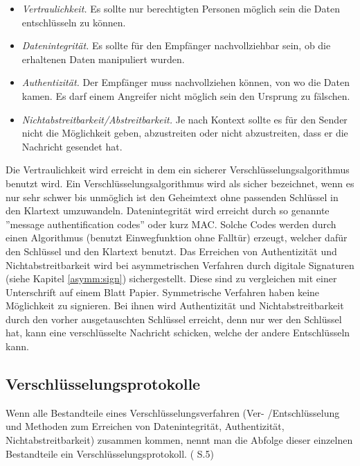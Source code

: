 \documentclass[a4paper,12pt,titlepage]{article}
\begin{document}
\begin{itemize}
\item \textit{Vertraulichkeit.} Es sollte nur berechtigten Personen möglich sein die Daten entschlüsseln zu können.

\item \textit{Datenintegrität.} Es sollte für den Empfänger nachvollziehbar sein, ob die erhaltenen Daten manipuliert wurden.

\item \textit{Authentizität.} Der Empfänger muss nachvollziehen können, von wo die Daten kamen. Es darf einem Angreifer nicht möglich sein den Ursprung zu fälschen.

\item \textit{Nichtabstreitbarkeit/Abstreitbarkeit.} Je nach Kontext sollte es für den Sender nicht die Möglichkeit geben, abzustreiten oder nicht abzustreiten, dass er die Nachricht gesendet hat.
\end{itemize} %
Die Vertraulichkeit wird erreicht in dem ein sicherer Verschlüsselungsalgorithmus benutzt wird. Ein Verschlüsselungsalgorithmus wird als sicher bezeichnet, wenn es nur sehr schwer bis unmöglich ist den Geheimtext ohne passenden Schlüssel in den Klartext umzuwandeln. Datenintegrität wird erreicht durch so genannte ''message authentification codes'' oder kurz MAC. Solche Codes werden durch einen Algorithmus (benutzt Einwegfunktion ohne Falltür) erzeugt, welcher dafür den Schlüssel und den Klartext benutzt. Das Erreichen von Authentizität und Nichtabstreitbarkeit wird bei asymmetrischen Verfahren durch digitale Signaturen (siehe Kapitel \ref{asymm:sign}) sichergestellt. Diese sind zu vergleichen mit einer Unterschrift auf einem Blatt Papier. Symmetrische Verfahren haben keine Möglichkeit zu signieren. Bei ihnen wird Authentizität und Nichtabstreitbarkeit durch den vorher ausgetauschten Schlüssel erreicht, denn nur wer den Schlüssel hat, kann eine verschlüsselte Nachricht schicken, welche der andere Entschlüsseln kann.

\subsection{Verschlüsselungsprotokolle}
Wenn alle Bestandteile eines Verschlüsselungsverfahren (Ver- /Entschlüsselung und Methoden zum Erreichen von Datenintegrität, Authentizität, Nichtabstreitbarkeit) zusammen kommen, nennt man die Abfolge dieser einzelnen Bestandteile ein Verschlüsselungsprotokoll. (\cite{delfs_knebl} S.5)
\end{document}

